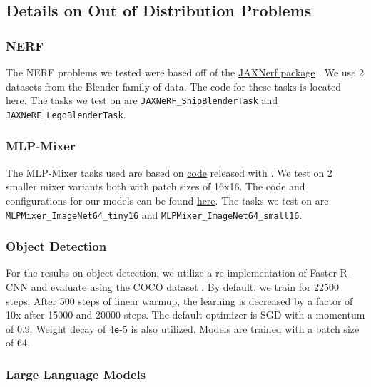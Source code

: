 \documentclass[11pt]{article}
\newcommand{\e}{\texttt{e}}
\begin{document}
\subsection{Details on Out of Distribution Problems}

\subsubsection{NERF} The NERF problems we tested were based off of the \href{https://github.com/google-research/google-research/tree/master/jaxnerf}{JAXNerf package} \citep{jaxnerf2020github}. We use 2 datasets from the Blender family of data.
The code for these tasks is located \href{https://github.com/google/learned_optimization/blob/a42b207b9ef5395fdf7e64978c26379ccba4e264/learned_optimization/research/jaxnerf/jaxnerf.py}{here}. The tasks we test on are \texttt{JAXNeRF\_ShipBlenderTask} and \texttt{JAXNeRF\_LegoBlenderTask}. 

\subsubsection{MLP-Mixer} The MLP-Mixer tasks used are based on \href{https://github.com/google-research/vision_transformer}{code} released with \citet{tolstikhin2021mlp}. We test on 2 smaller mixer variants both with patch sizes of 16x16.
The code and configurations for our models can be found \href{https://github.com/google/learned_optimization/blob/4447601601f04e3dc7b1aecd7854d44526593752/learned_optimization/tasks/fixed/mlp_mixer.py}{here}. The tasks we test on are \texttt{MLPMixer\_ImageNet64\_tiny16} and \texttt{MLPMixer\_ImageNet64\_small16}.

\subsubsection{Object Detection}

For the results on object detection, we utilize a re-implementation of Faster R-CNN \citep{ren2015faster} and evaluate using the COCO dataset \citep{lin2014microsoft}. By default, we train for 22500 steps. After 500 steps of linear warmup, the learning is decreased by a factor of 10x after 15000 and 20000 steps. The default optimizer is SGD with a momentum of 0.9. Weight decay of 4\e-5 is also utilized. Models are trained with a batch size of 64.

\subsubsection{Large Language Models}
\label{sec:llm}
\end{document}
